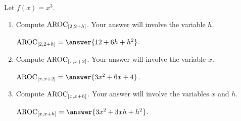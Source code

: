 \documentclass{ximera}
\author{Kenneth Berglund}
\begin{document}
\licenseSZ
\begin{exercise}

Let $f(x) = x^3$.

\begin{enumerate}
\item Compute $\mathrm{AROC}_{[2, 2 + h]}$. Your answer will involve the variable $h$.

$\av_{[2, 2+h]} = \answer{12 + 6h + h^2}$.

\item Compute $\mathrm{AROC}_{[x, x+2]}$. Your answer will involve the variable $x$.

$\av_{[x, x + 2]} = \answer{3x^2 + 6x + 4}$.

\item Compute $\mathrm{AROC}_{[x, x+h]}$. Your answer will involve the variables $x$ and $h$.

$\av_{[x, x + h]} = \answer{3x^2 + 3xh + h^2}$.
	
\end{enumerate}

\end{exercise}
\end{document}
